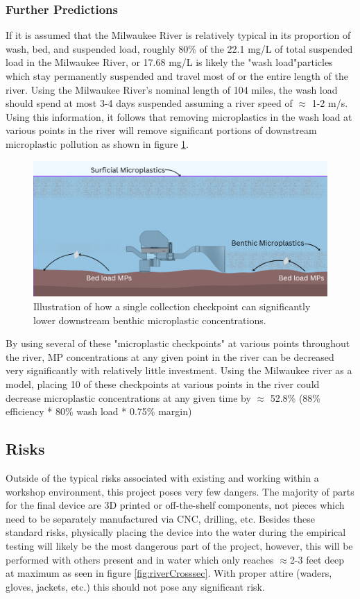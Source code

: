 \documentclass[fleqn,10pt]{SelfArx} %
\begin{document}
	\subsubsection{Further Predictions}	
	If it is assumed that the Milwaukee River is relatively typical in its proportion of wash, bed, and suspended load, roughly 80\% of the 22.1 mg/L of total suspended load in the Milwaukee River, or 17.68 mg/L is likely the "wash load"\textemdash particles which stay permanently suspended and travel most of or the entire length of the river. Using the Milwaukee River's nominal length of 104 miles, the wash load should spend at most 3-4 days suspended assuming a river speed of $\approx$ 1-2 m/s. 
	\linebreak
	Using this information, it follows that removing microplastics in the wash load at various points in the river will remove significant portions of downstream microplastic pollution as shown in figure \ref{fig:washload}.
\begin{figure}[h]
	\centering
	\includegraphics[width=1\linewidth]{Figures/WashLoadCollection}
	\caption[Wash Load MP Collection]{Illustration of how a single collection checkpoint can significantly lower downstream benthic microplastic concentrations.}
	\label{fig:washload}
\end{figure}
By using several of these "microplastic checkpoints" at various points throughout the river, MP concentrations at any given point in the river can be decreased very significantly with relatively little investment. Using the Milwaukee river as a model, placing 10 of these checkpoints at various points in the river could decrease microplastic concentrations at any given time by $\approx$ 52.8\% (88\% efficiency * 80\% wash load * 0.75\% margin)
	\subsection{Risks}
	Outside of the typical risks associated with existing and working within a workshop environment, this project poses very few dangers. The majority of parts for the final device are 3D printed or off-the-shelf components, not pieces which need to be separately manufactured via CNC, drilling, etc. Besides these standard risks, physically placing the device into the water during the empirical testing will likely be the most dangerous part of the project, however, this will be performed with others present and in water which only reaches $\approx$2-3 feet deep at maximum as seen in figure \ref{fig:riverCrosssec}. With proper attire (waders, gloves, jackets, etc.) this should not pose any significant risk.
	
\end{document}
